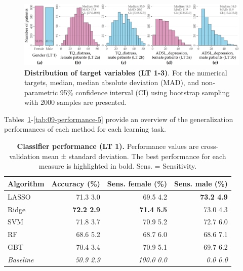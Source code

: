 \documentclass[
  oneside]{book}
\begin{document}
\begin{figure}[htb]

{\centering \includegraphics[width=1\linewidth]{figures/09-targets} 

}

\caption{\textbf{Distribution of target variables (LT 1-3)}. For the numerical targets, median, median absolute deviation (MAD), and non-parametric 95\% confidence interval (CI) using bootstrap sampling \autocite{DiCissio:Bootstrap1996} with 2000 samples are presented.}\label{fig:09-targets}
\end{figure}

Tables~\ref{tab:09-performance-1}-\ref{tab:09-performance-5} provide an overview of the generalization performances of each method for each learning task.



\begin{table}

\caption{\label{tab:09-performance-1}\textbf{Classifier performance (LT 1).} Performance values are cross-validation mean ± standard deviation. The best performance for each measure is highlighted in bold. Sens. = Sensitivity.}
\centering
\begin{tabular}[t]{lrrr}
\toprule
\textbf{Algorithm} & \textbf{Accuracy (\%)} & \textbf{Sens. female (\%)} & \textbf{Sens. male (\%)}\\
\midrule
LASSO & 71.3 \textpm{} 3.0 & 69.5 \textpm{} 4.2 & \textbf{73.2 \textpm{} 4.9}\\
Ridge & \textbf{72.2 \textpm{} 2.9} & \textbf{71.4 \textpm{} 5.5} & 73.0 \textpm{} 4.3\\
SVM & 71.8 \textpm{} 3.7 & 70.9 \textpm{} 5.2 & 72.7 \textpm{} 6.0\\
RF & 68.6 \textpm{} 5.2 & 68.7 \textpm{} 6.0 & 68.6 \textpm{} 7.1\\
GBT & 70.4 \textpm{} 3.4 & 70.9 \textpm{} 5.1 & 69.7 \textpm{} 6.2\\
\midrule
\addlinespace
\em{Baseline} & \em{50.9 \textpm{} 2.9} & \em{100.0 \textpm{} 0.0} & \em{0.0 \textpm{} 0.0}\\
\bottomrule
\end{tabular}
\end{table}
\end{document}
